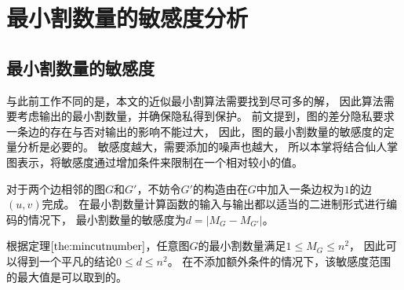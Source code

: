 \chapter{最小割数量的敏感度分析}
\section{最小割数量的敏感度}
与此前工作不同的是，本文的近似最小割算法需要找到尽可多的解，
因此算法需要考虑输出的最小割数量，并确保隐私得到保护。
前文提到，图的差分隐私要求一条边的存在与否对输出的影响不能过大，
因此，图的最小割数量的敏感度的定量分析是必要的。
敏感度越大，需要添加的噪声也越大，
所以本掌将结合仙人掌图表示，将敏感度通过增加条件来限制在一个相对较小的值。

对于两个边相邻的图$G$和$G'$，不妨令$G'$的构造由在$G$中加入一条边权为$1$的边$(u,v)$完成。
在最小割数量计算函数的输入与输出都以适当的二进制形式进行编码的情况下，
最小割数量的敏感度为$d=|M_G-M_{G'}|$。

根据定理$\ref{the:mincutnumber}$，任意图$G$的最小割数量满足$1\leq M_G\leq n^2$，
因此可以得到一个平凡的结论$0\leq d\leq n^2$。
在不添加额外条件的情况下，该敏感度范围的最大值是可以取到的。


